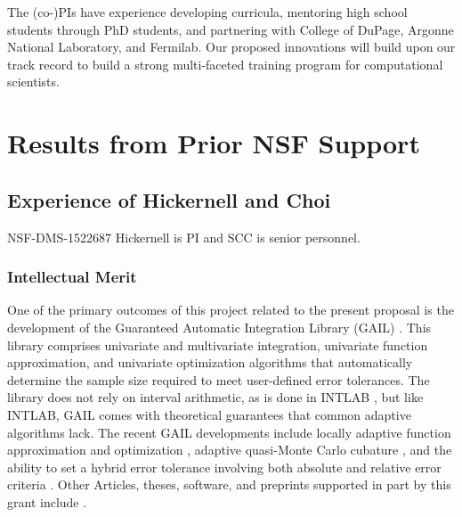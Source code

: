 \documentclass[11pt]{NSFamsart}
\begin{document}
The (co-)PIs have experience developing curricula, mentoring high school students through PhD students, and partnering with College of DuPage, Argonne National Laboratory, and Fermilab.  Our proposed innovations will build upon our track record to build a strong multi-faceted training program for computational scientists.

\section{Results from Prior NSF Support} 
\subsection{Experience of Hickernell and Choi}
NSF-DMS-1522687 \label{SectHickernellPrevious}  Hickernell is PI and SCC is senior personnel.  

\subsubsection{Intellectual Merit}
One of the primary outcomes of this project related to the present proposal is the development of the Guaranteed Automatic Integration Library (GAIL) \cite{ChoEtal17b}.  This library comprises univariate and multivariate integration, univariate function approximation, and univariate optimization algorithms that automatically determine the sample size required to meet user-defined error tolerances.  The library does not rely on interval arithmetic, as is done in INTLAB \cite{MoKeCl09, Rum99a, Rum10a}, but like INTLAB, GAIL comes with theoretical guarantees that common adaptive algorithms lack. The recent GAIL developments include locally adaptive function approximation and optimization \cite{ChoEtal17a, Din15a}, adaptive quasi-Monte Carlo cubature \cite{HicJim16a, JimHic16a}, and the ability to set a hybrid error tolerance involving both absolute and relative error criteria \cite{HicEtal17a}.  Other Articles, theses,  software, and preprints supported in part by this grant include 
\cite{ala_augmented_2017, 
	GilEtal16a,
	GilJim16b,
	HicEtal18a,	
	Hic17a,
	JohFasHic18a,
	Li16a,
	Liu17a,
	mccourt_stable_2017,
	mishra_hybrid_nodate,
	mishra_stable_nodate, 
	rashidinia_stable_nodate,
	vu_rbf-fd_nodate,
	Zha17a,
	Zho15a,
	ZhoHic15a}.
    
\end{document}
